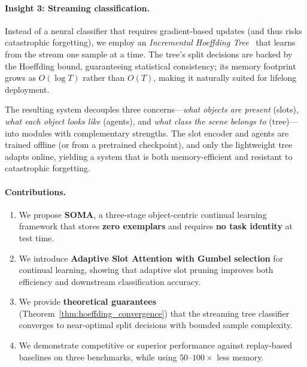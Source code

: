 \documentclass{article}
\begin{document}
\paragraph{Insight 3: Streaming classification.}
Instead of a neural classifier that requires gradient-based updates (and thus risks catastrophic forgetting), we employ an \textit{Incremental Hoeffding Tree}~\citep{domingos2000mining, bifet2009adaptive} that learns from the stream one sample at a time.
The tree's split decisions are backed by the Hoeffding bound, guaranteeing statistical consistency; its memory footprint grows as $O(\log T)$ rather than $O(T)$, making it naturally suited for lifelong deployment.

The resulting system decouples three concerns---\textit{what objects are present} (slots), \textit{what each object looks like} (agents), and \textit{what class the scene belongs to} (tree)---into modules with complementary strengths. The slot encoder and agents are trained offline (or from a pretrained checkpoint), and only the lightweight tree adapts online, yielding a system that is both memory-efficient and resistant to catastrophic forgetting.

\paragraph{Contributions.}
\begin{enumerate}
    \item We propose \textbf{SOMA}, a three-stage object-centric continual learning framework that stores \textbf{zero exemplars} and requires \textbf{no task identity} at test time.
    \item We introduce \textbf{Adaptive Slot Attention with Gumbel selection} for continual learning, showing that adaptive slot pruning improves both efficiency and downstream classification accuracy.
    \item We provide \textbf{theoretical guarantees} (Theorem~\ref{thm:hoeffding_convergence}) that the streaming tree classifier converges to near-optimal split decisions with bounded sample complexity.
    \item We demonstrate competitive or superior performance against replay-based baselines on three benchmarks, while using $50$--$100\times$ less memory.
\end{enumerate}


\end{document}
